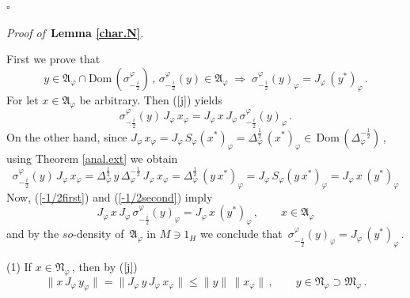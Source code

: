 \documentclass[reqno]{amsart}
\theoremstyle{definition}
\theoremstyle{remark}
\numberwithin{equation}{section}
\theoremstyle{plain}
\begin{document}
\hfill $\square\quad$

\medskip

{\it Proof of }$\,${\bf Lemma \ref{char.N}}.
\medskip

First we prove that
\begin{equation}\label{-1/2}
y\in\mathfrak A_\varphi\cap\text{Dom}\, (\sigma^\varphi_{-\frac i2})
\, ,\,\sigma^\varphi_{-\frac i2} (y)\in\mathfrak A_\varphi\;
\Longrightarrow\; \sigma^\varphi_{-\frac i2} (y)_\varphi =
J_\varphi\, (y^*)_\varphi\, .
\end{equation}
For let $x\in\mathfrak A_\varphi$ be arbitrary. Then (\ref{j}) yields
\begin{equation}\label{-1/2first}
\sigma^\varphi_{-\frac i2} (y)\, J_\varphi\, x_\varphi =
J_\varphi\, x\, J_\varphi\,\sigma^\varphi_{-\frac i2} (y)_\varphi\, .
\end{equation}
On the other hand, since $J_\varphi\, x_\varphi =J_\varphi\, S_\varphi
(x^*)_\varphi =\Delta_\varphi^{\frac 12}\, (x^*)_\varphi\in\,\text{Dom}
\, (\Delta_\varphi^{-\frac 12})\,$,
using Theorem \ref{anal.ext} we obtain
\begin{equation}\label{-1/2second}
\sigma^\varphi_{-\frac i2} (y)\, J_\varphi\, x_\varphi =
\Delta_\varphi^{\frac 12}\, y\,\Delta_\varphi^{-\frac 12}\, J_\varphi
\, x_\varphi =\Delta_\varphi^{\frac 12}\, (y\, x^*)_\varphi =
J_\varphi\, S_\varphi (y\, x^*)_\varphi =J_\varphi\, x\,
(y^*)_\varphi
\end{equation}
Now, (\ref{-1/2first}) and (\ref{-1/2second}) imply
\begin{equation*}
J_\varphi\, x\, J_\varphi\,\sigma^\varphi_{-\frac i2} (y)_\varphi =
J_\varphi\, x\, (y^*)_\varphi\,
,\qquad x\in\mathfrak A_\varphi
\end{equation*}
and by the $so$-density of $\,\mathfrak A_\varphi$ in $M\ni 1_H$
we conclude that $\,\sigma^\varphi_{-\frac i2} (y)_\varphi =
J_\varphi\, (y^*)_\varphi\,$.
\smallskip

(1) If $x\in\mathfrak N_\varphi\,$, then by (\ref{j})
\begin{equation*}
\| x\, J_\varphi\, y_\varphi\| =\| J_\varphi\, y\, J_\varphi\,
x_\varphi\|\leq \| y\|\,\| x_\varphi\|\, ,\qquad y\in
\mathfrak N_\varphi\supset\mathfrak M_\varphi\, .
\end{equation*}
\end{document}
